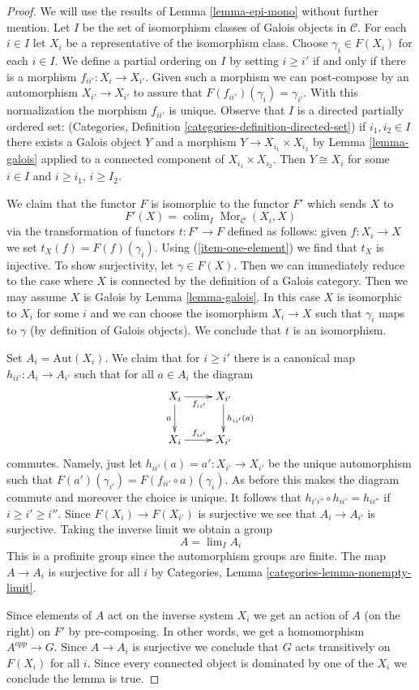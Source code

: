 \documentclass[10pt,a4paper]{amsart}
\theoremstyle{plain}
\theoremstyle{definition}
\theoremstyle{remark}
\numberwithin{equation}{subsection}
\def\lim{\mathop{\mathrm{lim}}\nolimits}
\def\colim{\mathop{\mathrm{colim}}\nolimits}
\def\Mor{\mathop{\mathrm{Mor}}\nolimits}
\begin{document}
\begin{proof}
We will use the results of Lemma \ref{lemma-epi-mono} without further mention.
Let $I$ be the set of isomorphism classes of Galois objects in $\mathcal{C}$.
For each $i \in I$ let $X_i$ be a representative of the isomorphism class.
Choose $\gamma_i \in F(X_i)$ for each $i \in I$.
We define a partial ordering on $I$ by setting $i \geq i'$ if
and only if there is a morphism $f_{ii'} : X_i \to X_{i'}$.
Given such a morphism we can post-compose by an automorphism
$X_{i'} \to X_{i'}$ to assure that $F(f_{ii'})(\gamma_i) = \gamma_{i'}$.
With this normalization the morphism $f_{ii'}$ is unique.
Observe that $I$ is a directed partially ordered set:
(Categories, Definition \ref{categories-definition-directed-set})
if $i_1, i_2 \in I$ there exists a Galois object $Y$ and a morphism
$Y \to X_{i_1} \times X_{i_2}$ by Lemma \ref{lemma-galois} applied
to a connected component of $X_{i_1} \times X_{i_2}$.
Then $Y \cong X_i$ for some $i \in I$ and $i \geq i_1$, $i \geq I_2$.

\medskip\noindent
We claim that the functor $F$ is isomorphic to the functor $F'$
which sends $X$ to
$$
F'(X) = \colim_I \Mor_\mathcal{C}(X_i, X)
$$
via the transformation of functors $t : F' \to F$ defined as follows:
given $f : X_i \to X$ we set $t_X(f) = F(f)(\gamma_i)$.
Using (\ref{item-one-element}) we find that $t_X$ is injective.
To show surjectivity, let $\gamma \in F(X)$. Then we can immediately
reduce to the case where $X$ is connected by the definition of
a Galois category. Then we may assume $X$ is Galois by
Lemma \ref{lemma-galois}. In this case $X$ is isomorphic to $X_i$
for some $i$ and we can choose the isomorphism $X_i \to X$ such
that $\gamma_i$ maps to $\gamma$ (by definition of Galois objects).
We conclude that $t$ is an isomorphism.

\medskip\noindent
Set $A_i = \text{Aut}(X_i)$.
We claim that for $i \geq i'$ there is a canonical map
$h_{ii'} : A_i \to A_{i'}$ such that for all $a \in A_i$
the diagram
$$
\xymatrix{
X_i \ar[d]_a \ar[r]_{f_{ii'}} & X_{i'} \ar[d]^{h_{ii'}(a)} \\
X_i \ar[r]^{f_{ii'}} & X_{i'}
}
$$
commutes. Namely, just let $h_{ii'}(a) = a' : X_{i'} \to X_{i'}$
be the unique automorphism such that
$F(a')(\gamma_{i'}) = F(f_{ii'} \circ a)(\gamma_i)$.
As before this makes the diagram commute and moreover the choice
is unique.
It follows that
$h_{i'i''} \circ h_{ii'} = h_{ii''}$
if $i \geq i' \geq i''$.
Since $F(X_i) \to F(X_{i'})$ is surjective we see that
$A_i \to A_{i'}$ is surjective.
Taking the inverse limit we obtain a group
$$
A = \lim_I A_i
$$
This is a profinite group since the automorphism groups are finite.
The map $A \to A_i$ is surjective for all $i$ by
Categories, Lemma \ref{categories-lemma-nonempty-limit}.

\medskip\noindent
Since elements of $A$ act on the inverse system $X_i$ we get an action of
$A$ (on the right) on $F'$ by pre-composing. In other words, we get
a homomorphism $A^{opp} \to G$. Since $A \to A_i$ is surjective we conclude
that $G$ acts transitively on $F(X_i)$ for all $i$. Since every connected
object is dominated by one of the $X_i$ we conclude the lemma is true.
\end{proof}
\end{document}

